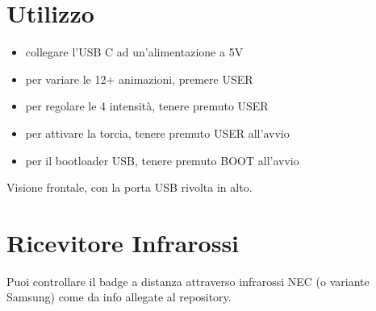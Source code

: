 \documentclass[10pt]{datasheet}
\newcommand*\circled[1]{\tikz[baseline=(char.base)]{
		\node[shape=circle,draw,inner sep=2pt, fill=white] (char) {#1};}}
\begin{document}
	
	\section{Utilizzo}
	
	\begin{itemize}[itemsep=1pt]
		\item{collegare l'USB C ad un'alimentazione a 5V}
		\item{per variare le 12+ animazioni, premere USER}
		\item{per regolare le 4 intensità, tenere premuto USER}
		\item{per attivare la torcia, tenere premuto USER all'avvio}
		\item{per il bootloader USB, tenere premuto BOOT all'avvio}
	\end{itemize}
	

	\begin{center}

	\end{center}
		Visione frontale, con la porta USB rivolta in alto. 
		
		\section{Ricevitore Infrarossi}
		Puoi controllare il badge a distanza attraverso infrarossi NEC (o variante Samsung) come da info allegate al repository.
	
\end{document}
